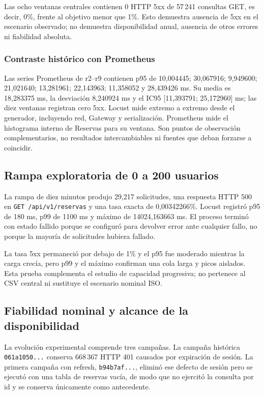 Las ocho ventanas centrales contienen 0 HTTP 5xx de 57\,241 consultas GET, es
decir, 0\%, frente al objetivo menor que 1\%. Esto demuestra ausencia de 5xx en
el escenario observado; no demuestra disponibilidad anual, ausencia de otros
errores ni fiabilidad absoluta.

\subsubsection{Contraste histórico con Prometheus}

Las series Prometheus de r2--r9 contienen p95 de 10,004445; 30,067916;
9,949600; 21,021640; 13,281961; 22,143963; 11,358052 y 28,439426 ms. Su media es
18,283375 ms, la desviación 8,240924 ms y el IC95 [11,393791; 25,172960] ms;
las diez ventanas registran cero 5xx. Locust mide extremo a extremo desde el
generador, incluyendo red, Gateway y serialización. Prometheus mide el histograma
interno de Reservas para su ventana. Son puntos de observación complementarios,
no resultados intercambiables ni fuentes que deban forzarse a coincidir.

\subsection{Rampa exploratoria de 0 a 200 usuarios}
\label{subsec:rampa-exploratoria}

La rampa de diez minutos produjo 29,217 solicitudes, una respuesta HTTP 500 en
\texttt{GET /api/v1/reservas} y una tasa exacta de 0,00342266\%. Locust registró
p95 de 180 ms, p99 de 1100 ms y máximo de 14024,163663 ms. El proceso terminó
con estado fallido porque se configuró para devolver error ante cualquier fallo,
no porque la mayoría de solicitudes hubiera fallado.

La tasa 5xx permaneció por debajo de 1\% y el p95 fue moderado mientras la carga
crecía, pero p99 y el máximo confirman una cola larga y picos aislados. Esta
prueba complementa el estudio de capacidad progresiva; no pertenece al CSV
central ni sustituye el escenario nominal ISO.

\subsection{Fiabilidad nominal y alcance de la disponibilidad}
\label{subsec:fiabilidad-disponibilidad}

La evolución experimental comprende tres campañas. La campaña histórica
\texttt{061a1050...} conserva 668\,367 HTTP 401 causados por expiración de
sesión. La primera campaña con refresh, \texttt{b94b7af...}, eliminó ese
defecto de sesión pero se ejecutó con una tabla de reservas vacía, de modo que
no ejercitó la consulta por id y se conserva únicamente como antecedente.

